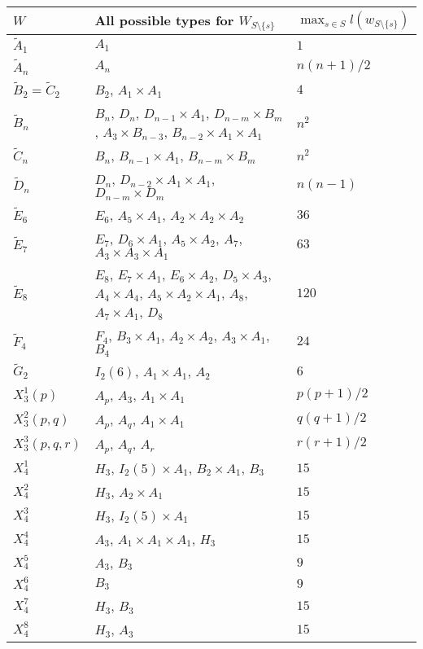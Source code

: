 \begin{table}[ht]
	\centering
	\begin{tabular}{l|p{7cm}|l}
		$W$ & All possible types for $W_{S \setminus \{s\}}$ & $\max_{s \in S} l(w_{S \setminus \{s\}})$ \\
		\hline
		$\tilde A_1$ & $A_1$ & $1$ \\
		$\tilde A_n$ & $A_n$ & $n(n+1)/2$ \\
		$\tilde B_2 = \tilde C_2$ & $B_2$, $A_1 \times A_1$ & $4$ \\
		$\tilde B_n$ & $B_n$, $D_n$, $D_{n-1} \times A_1$, $D_{n-m} \times B_m$, $A_3 \times B_{n-3}$, $B_{n-2} \times A_1 \times A_1$ & $n^2$ \\
		$\tilde C_n$ & $B_n$, $B_{n-1} \times A_1$, $B_{n-m} \times B_m$ & $n^2$ \\
		$\tilde D_n$ & $D_n$, $D_{n-2} \times A_1 \times A_1$, $D_{n-m} \times D_m$ & $n(n-1)$ \\
		$\tilde E_6$ & $E_6$, $A_5 \times A_1$, $A_2 \times A_2 \times A_2$ & $36$ \\
		$\tilde E_7$ & $E_7$, $D_6 \times A_1$, $A_5 \times A_2$, $A_7$, $A_3 \times A_3 \times A_1$ & $63$ \\
		$\tilde E_8$ & $E_8$, $E_7 \times A_1$, $E_6 \times A_2$, $D_5 \times A_3$, $A_4 \times A_4$, $A_5 \times A_2 \times A_1$, $A_8$, $A_7 \times A_1$, $D_8$ & $120$ \\
		$\tilde F_4$ & $F_4$, $B_3 \times A_1$, $A_2 \times A_2$, $A_3 \times A_1$, $B_4$ & $24$ \\
		$\tilde G_2$ & $I_2(6)$, $A_1 \times A_1$, $A_2$ & $6$ \\
		$X_3^1(p)$ & $A_p$, $A_3$, $A_1 \times A_1$ & $p(p+1)/2$ \\
		$X_3^2(p,q)$ & $A_p$, $A_q$, $A_1 \times A_1$ & $q(q+1)/2$  \\
		$X_3^3(p,q,r)$ & $A_p$, $A_q$, $A_r$ & $r(r+1)/2$  \\
		$X_4^1$ & $H_3$, $I_2(5) \times A_1$, $B_2 \times A_1$, $B_3$ & $15$ \\
		$X_4^2$ & $H_3$, $A_2 \times A_1$ & $15$ \\
		$X_4^3$ & $H_3$, $I_2(5) \times A_1$ & $15$ \\
		$X_4^4$ & $A_3$, $A_1 \times A_1 \times A_1$, $H_3$ & $15$ \\
		$X_4^5$ & $A_3$, $B_3$ & $9$ \\
		$X_4^6$ & $B_3$ & $9$ \\
		$X_4^7$ & $H_3$, $B_3$ & $15$ \\
		$X_4^8$ & $H_3$, $A_3$ & $15$ \\

\end{tabular}
\end{table}
